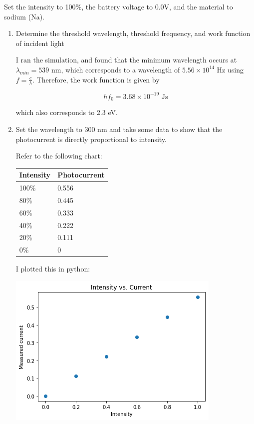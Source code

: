 \documentclass[10pt]{article}
\begin{document}
        Set the intensity to 100\%, the battery voltage to 0.0V, and the material to sodium (Na). 

        \begin{enumerate}[start, label=\alph*)]
            \item Determine the threshold wavelength, threshold frequency, and work function of incident light 
            \begin{solution}
                I ran the simulation, and found that the minimum wavelength occurs at $\lambda_{min} = 539$ nm, which corresponds to a wavelength of $5.56 \times 10^{14}$ Hz using $f = \frac{c}{\lambda}$. Therefore, the work function is given by 

                \[ hf_0 = 3.68\times 10^{-19} \text{ Js}\]

                which also corresponds to 2.3 eV.
            \end{solution}

            \item Set the wavelength to 300 nm and take some data to show that the photocurrent is directly proportional to intensity.
            
            \begin{solution}
                Refer to the following chart: 

                \begin{center}
                    \begin{tabular}{l|l}
                        Intensity & Photocurrent \\ \hline
                        100\%     & 0.556        \\
                        80\%      & 0.445        \\
                        60\%      & 0.333        \\
                        40\%      & 0.222        \\
                        20\%      & 0.111        \\
                        0\%       & 0           
                    \end{tabular}
                \end{center}

                I plotted this in python:

                \begin{center}
                    \includegraphics[scale=0.8]{intensityvscurrent.png}
                \end{center}


\end{solution}
\end{enumerate}
\end{document}
